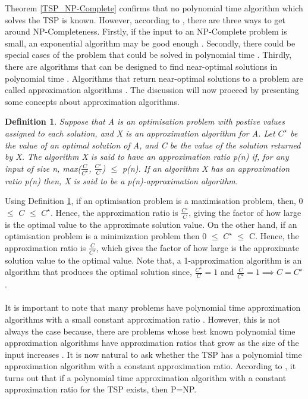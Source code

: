 \documentclass{article}
\newtheorem{definition}{Definition}[subsection]
\begin{document}
Theorem \ref{TSP_NP-Complete} confirms that no polynomial time algorithm which solves the TSP is known. However, according to \cite{cormen_leiserson_rivest_stein}, there are three ways to get around NP-Completeness. Firstly, if the input to an NP-Complete problem is small, an exponential algorithm may be good enough \cite{cormen_leiserson_rivest_stein}. Secondly, there could be special cases of the problem that could be solved in polynomial time \cite{cormen_leiserson_rivest_stein}. Thirdly, there are algorithms that can be designed to find near-optimal solutions in polynomial time \cite{cormen_leiserson_rivest_stein}. Algorithms that return near-optimal solutions to a problem are called approximation algorithms \cite{cormen_leiserson_rivest_stein}. The discussion will now proceed by presenting some concepts about approximation algorithms.
\begin{definition}
\label{p(n)-approximation algorithm}
Suppose that A is an optimisation problem with postive values assigned to each solution, and X is an approximation algorithm for A. Let $C^\star$ be the value of an optimal solution of A, and C be the value of the solution returned by X. The algorithm X is said to have an approximation ratio p(n) if, for any input of size n, max($\frac{C}{C^\star}$, $\frac{C^\star}{C}$) $\leq$ p(n). If an algorithm X has an approximation ratio p(n) then, X is said to be a p(n)-approximation algorithm. {}
\end{definition}
Using Definition \ref{p(n)-approximation algorithm}, if an optimisation problem is a maximisation problem, then, 0 $\le$ $C$ $\leq$ $C^\star$. Hence, the approximation ratio is $\frac{C^\star}{C}$, giving the factor of how large is the optimal value to the approximate solution value. On the other hand, if an optimisation problem is a minimization problem then 0 $\le$ $C^\star$ $\leq$ C. Hence, the approximation ratio is $\frac{C}{C^\star}$, which gives the factor of how large is the approximate solution value to the optimal value. Note that, a 1-approximation algorithm is an algorithm that produces the optimal solution since, $\frac{C^\star}{C} = 1$ and $\frac{C}{C^\star} = 1 \implies C = C^\star$. \cite{cormen_leiserson_rivest_stein}
\\\\
It is important to note that many problems have polynomial time approximation algorithms with a small constant approximation ratio \cite{cormen_leiserson_rivest_stein}. However, this is not always the case because, there are problems whose best known polynomial time approximation algorithms have approximation ratios that grow as the size of the input increases \cite{cormen_leiserson_rivest_stein}. It is now natural to ask whether the TSP has a polynomial time approximation algorithm with a constant approximation ratio. According to \cite{cormen_leiserson_rivest_stein}, it turns out that if a polynomial time approximation algorithm with a constant approximation ratio for the TSP exists, then P=NP.
\end{document}
